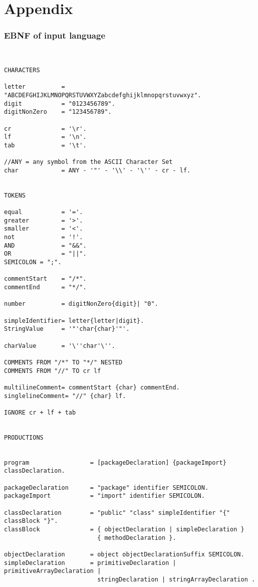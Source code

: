 \part{Appendix}
\section{EBNF of input language}
\label{labelEBNF}

\begin{verbatim}


CHARACTERS

letter          = "ABCDEFGHIJKLMNOPQRSTUVWXYZabcdefghijklmnopqrstuvwxyz".
digit           = "0123456789".
digitNonZero    = "123456789".

cr              = '\r'.
lf              = '\n'.
tab             = '\t'.

//ANY = any symbol from the ASCII Character Set
char            = ANY - '"' - '\\' - '\'' - cr - lf.


TOKENS

equal           = '='.
greater         = '>'.
smaller         = '<'.
not             = '!'.
AND             = "&&".
OR              = "||".
SEMICOLON = ";".

commentStart    = "/*".
commentEnd      = "*/".

number          = digitNonZero{digit}| "0".

simpleIdentifier= letter{letter|digit}.
StringValue     = '"'char{char}'"'.

charValue       = '\''char'\''.

COMMENTS FROM "/*" TO "*/" NESTED 
COMMENTS FROM "//" TO cr lf

multilineComment= commentStart {char} commentEnd.
singlelineComment= "//" {char} lf.

IGNORE cr + lf + tab


PRODUCTIONS 


program                 = [packageDeclaration] {packageImport} classDeclaration.

packageDeclaration      = "package" identifier SEMICOLON.
packageImport           = "import" identifier SEMICOLON.

classDeclaration        = "public" "class" simpleIdentifier "{" classBlock "}".
classBlock              = { objectDeclaration | simpleDeclaration } 
                          { methodDeclaration }.

objectDeclaration       = object objectDeclarationSuffix SEMICOLON. 
simpleDeclaration       = primitiveDeclaration | primitiveArrayDeclaration | 
                          stringDeclaration | stringArrayDeclaration .


\end{verbatim}
